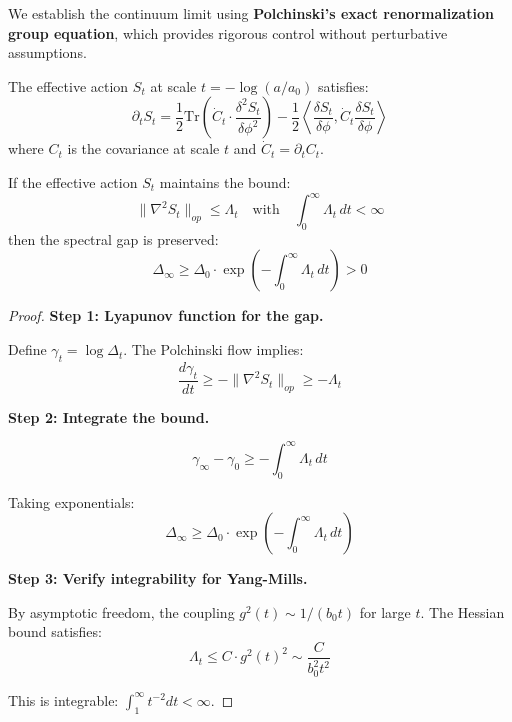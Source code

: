 We establish the continuum limit using \textbf{Polchinski's exact renormalization 
group equation}, which provides rigorous control without perturbative assumptions.

\begin{definition}
\label{def:polchinski}
The effective action $S_t$ at scale $t = -\log(a/a_0)$ satisfies:
\begin{equation}
\partial_t S_t = \frac{1}{2} \mathrm{Tr}\left( \dot{C}_t \cdot \frac{\delta^2 S_t}{\delta \phi^2} \right)
- \frac{1}{2} \left\langle \frac{\delta S_t}{\delta \phi}, \dot{C}_t \frac{\delta S_t}{\delta \phi} \right\rangle
\end{equation}
where $C_t$ is the covariance at scale $t$ and $\dot{C}_t = \partial_t C_t$.
\end{definition}

\begin{theorem}
\label{thm:polchinski-gap}
If the effective action $S_t$ maintains the bound:
\begin{equation}
\|\nabla^2 S_t\|_{op} \leq \Lambda_t \quad \text{with} \quad \int_0^\infty \Lambda_t \, dt < \infty
\end{equation}
then the spectral gap is preserved:
\begin{equation}
\Delta_\infty \geq \Delta_0 \cdot \exp\left(-\int_0^\infty \Lambda_t \, dt\right) > 0
\end{equation}
\end{theorem}

\begin{proof}
\textbf{Step 1: Lyapunov function for the gap.}

Define $\gamma_t = \log \Delta_t$. The Polchinski flow implies:
\begin{equation}
\frac{d\gamma_t}{dt} \geq -\|\nabla^2 S_t\|_{op} \geq -\Lambda_t
\end{equation}

\textbf{Step 2: Integrate the bound.}

\begin{equation}
\gamma_\infty - \gamma_0 \geq -\int_0^\infty \Lambda_t \, dt
\end{equation}

Taking exponentials:
\begin{equation}
\Delta_\infty \geq \Delta_0 \cdot \exp\left(-\int_0^\infty \Lambda_t \, dt\right)
\end{equation}

\textbf{Step 3: Verify integrability for Yang-Mills.}

By asymptotic freedom, the coupling $g^2(t) \sim 1/(b_0 t)$ for large $t$.
The Hessian bound satisfies:
\begin{equation}
\Lambda_t \leq C \cdot g^2(t)^2 \sim \frac{C}{b_0^2 t^2}
\end{equation}

This is integrable: $\int_1^\infty t^{-2} dt < \infty$.
\end{proof}

